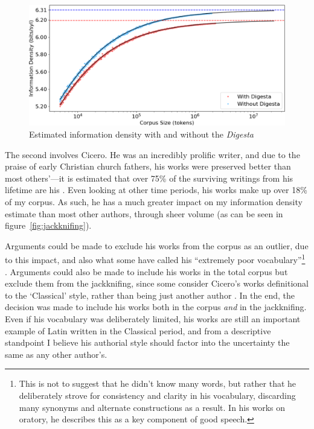 \documentclass[12pt,twoside,leqno]{article} %
\begin{document}
\begin{figure}[h]
\centering
\caption{Estimated information density with and without the \emph{Digesta}}
\label{fig:digesta}
\noindent\includegraphics[width=\linewidth]{digesta}
\end{figure}

The second involves Cicero. He was an incredibly prolific writer, and due to the praise of early Christian church fathers, his works were preserved better than most others'---it is estimated that over 75\% of the surviving writings from his lifetime are his \citep{harrison}. Even looking at other time periods, his works make up over 18\% of my corpus. As such, he has a much greater impact on my information density estimate than most other authors, through sheer volume (as can be seen in figure~\ref{fig:jackknifing}).

Arguments could be made to exclude his works from the corpus as an outlier, due to this impact, and also what some have called his ``extremely poor vocabulary''\footnote{This is not to suggest that he didn't know many words, but rather that he deliberately strove for consistency and clarity in his vocabulary, discarding many synonyms and alternate constructions as a result. In his works on oratory, he describes this as a key component of good speech.} \citep[136]{albrecht}. Arguments could also be made to include his works in the total corpus but exclude them from the jackknifing, since some consider Cicero's works definitional to the `Classical' style, rather than being just another author \citep[136]{albrecht}. In the end, the decision was made to include his works both in the corpus \emph{and} in the jackknifing. Even if his vocabulary was deliberately limited, his works are still an important example of Latin written in the Classical period, and from a descriptive standpoint I believe his authorial style should factor into the uncertainty the same as any other author's.
\end{document}
